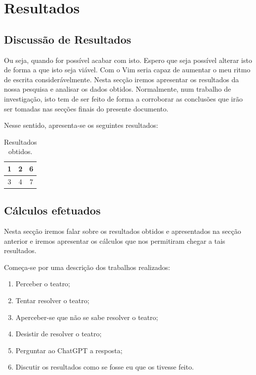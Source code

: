 
\section{Resultados}\label{sec:resultados}

\subsection{Discussão de Resultados}\label{subsec:discussao}

Ou seja, quando for possível acabar com isto.
Espero que seja possível alterar isto de forma a que isto seja viável.
Com o Vim seria capaz de aumentar o meu ritmo de escrita considerávelmente.
Nesta secção iremos apresentar os resultados da nossa pesquisa e analisar os dados obtidos.
Normalmente, num trabalho de investigação, isto tem de ser feito de forma a corroborar as conclusões que irão ser tomadas nas secções finais do presente documento.

Nesse sentido, apresenta-se os seguintes resultados:

\begin{table}[htb!]
    \centering
    \caption{Resultados obtidos.}
    \label{tab:tabela1}
    \begin{tabular}{|c|c|c|}
        \hline
        1 & 2 & 6 \\ \hline
        3 & 4 & 7 \\ \hline
    \end{tabular}
\end{table}

\subsection{Cálculos efetuados}\label{subsec:calculos}

Nesta secção iremos falar sobre os resultados obtidos e apresentados na secção anterior e iremos apresentar os cálculos que nos permitiram chegar a tais resultados.

Começa-se por uma descrição dos trabalhos realizados:
\begin{enumerate}
    \item Perceber o teatro;
    \item Tentar resolver o teatro;
    \item Aperceber-se que não se sabe resolver o teatro;
    \item Desistir de resolver o teatro;
    \item Perguntar ao ChatGPT a resposta;
    \item Discutir os resultados como se fosse eu que os tivesse feito.
\end{enumerate}

